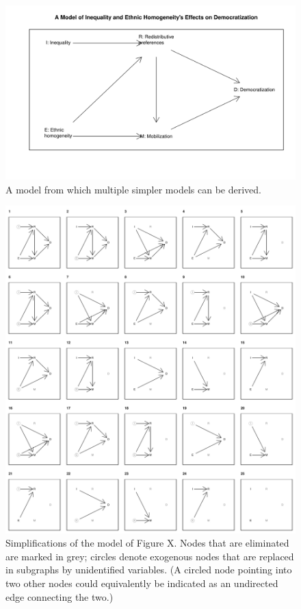 \documentclass[
  12pt,
]{book}
\begin{document}
\begin{figure}

{\centering \includegraphics[width=.5\textwidth]{ii_files/figure-latex/lowercomplexdem-1} 

}

\caption{A model  from which multiple simpler models can be derived.}\label{fig:lowercomplexdem}
\end{figure}

\begin{figure}
\centering
\includegraphics{ii_files/figure-latex/runningsubs-1.pdf}
\caption{\label{fig:runningsubs}Simplifications of the model of Figure X. Nodes that are eliminated are marked in grey; circles denote exogenous nodes that are replaced in subgraphs by unidentified variables. (A circled node pointing into two other nodes could equivalently be indicated as an undirected edge connecting the two.)}
\end{figure}
\end{document}
